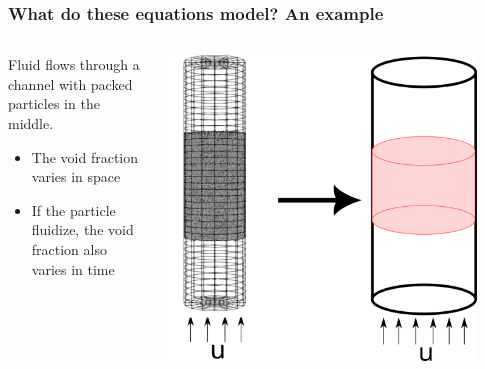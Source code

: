 \documentclass[c,11pt,xcolor=dvipsnames, aspectratio=169]{beamer}
\begin{document}
\begin{frame}
	\frametitle{\textbf{What do these equations model? An example}}
	
	\begin{columns}[c]
		\begin{column}{0.5\textwidth}
			Fluid flows through a channel with packed particles in the middle.
			\begin{itemize}
				\item The void fraction varies in space 
				\item If the particle fluidize, the void fraction also varies in time
			\end{itemize}
			\end{column}
		\begin{column}{0.5\textwidth}
			\vspace*{-\baselineskip}
			\begin{center}
				\includegraphics[width=0.9\textwidth]{images/vans_cylinder.png}
			\end{center}
		\end{column}
	\end{columns}
\end{frame}
\end{document}
